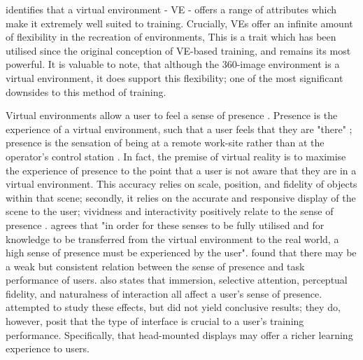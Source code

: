 \documentclass[ %
                    author={Elis Jones},
                supervisor={Dr. Kirsten Cater},
                    degree={BSc},
                     title={The Effect of Presentation Medium on Spatial Cognition},
                  subtitle={in the Virtual Environment},
                      year={2018} ]{dissertation}
\begin{document}
\citet{osberg} identifies that a virtual environment - VE - offers a range of attributes which make it extremely well suited to training. Crucially, VEs offer an infinite amount of flexibility in the recreation of environments, This is a trait which has been utilised since the original conception of VE-based training, and remains its most powerful. It is valuable to note, that although the 360-image environment is a virtual environment, it does support this flexibility; one of the most significant downsides to this method of training. 

Virtual environments allow a user to feel a sense of presence \citep{osberg}. Presence is the experience of a virtual environment, such that a user feels that they are "there" \citep{steuer}; presence is the sensation of being at a remote work-site rather than at the operator's control station \citep{Witmer1998}. In fact, the premise of virtual reality is to maximise the experience of presence to the point that a user is not aware that they are in a virtual environment. This accuracy relies on scale, position, and fidelity  of objects within that scene; secondly, it relies on the accurate and responsive display of the scene to the user; vividness and interactivity positively relate to the sense of presence \citep{steuer}. \cite{Gupta2008} agrees that "in order for these senses to be fully utilised and for knowledge to be transferred from the virtual environment to the real world, a high sense of presence must be experienced by the user". \cite{Witmer1998} found that there may be a weak but consistent relation between the sense of presence and task performance of users. \cite{Witmer1998} also states that immersion, selective attention, perceptual fidelity, and naturalness of interaction all affect a user's sense of presence. \cite{Romano2001} attempted to study these effects, but did not yield conclusive results; they do, however, posit that the type of interface is crucial to a user's training performance. Specifically, that head-mounted displays may offer a richer learning experience to users.
\end{document}
